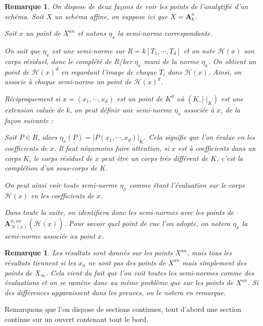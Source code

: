 \documentclass[11pt]{article}
\newcommand{\h}{\mathcal{H}}
\newcommand{\ana}{\mathbf{A}}
\newtheorem{rem}[thm]{Remarque}
\begin{document}
\begin{rem}
On dispose de deux façons de voir les points de l'analytifié d'un schéma. Soit $X$ un schéma affine, on suppose ici que $X = \ana^n_k$.

Soit $x$ un point de $X^{an}$ et notons $\eta_x$ la semi-norme correspondante.

On sait que $\eta_x$ est une semi-norme sur $R = k[T_1, \cdots, T_d]$ et on note $\mathcal{H}(x)$ son corps résiduel, donc le complété de $R/ker~\eta_x$ muni de la norme $\eta_x$. On obtient un point de $\mathcal{H}(x)^d$ en regardant l'image de chaque $T_i$ dans $\mathcal{H}(x)$. Ainsi, on associe à chaque semi-norme un point de $\mathcal{H}(x)^d$.

Réciproquement si $x = (x_1, \cdots, x_d)$ est un point de $K^d$ où $(K, |\cdot|_K)$ est une extension valuée de $k$, on peut définir une semi-norme $\eta_x$ associée à $x$, de la façon suivante : 

Soit $P \in R$, alors $\eta_x(P) = |P(x_1, \cdots, x_d)|_K$. Cela signifie que l'on évalue en les coefficients de $x$. Il faut néanmoins faire attention, si $x$ est à coefficients dans un corps $K$, le corps résiduel de $x$ peut être un corps très différent de $K$, c'est la complétion d'un sous-corps de $K$.

On peut ainsi voir toute semi-norme $\eta_x$ comme étant l'évaluation sur le corps $\mathcal{H}(x)$ en les coefficients de $x$.

Dans toute la suite, on identifiera donc les semi-normes avec les points de $\ana^{n,an}_{\h(x)}(\overline{\h(x)})$. Pour savoir quel point de vue l'on adopte, on notera $\eta_x$ la semi-norme associée au point $x$.
\end{rem}

\begin{rem}
Les résultats sont donnés sur les points $X^{an}$, mais tous les résultats tiennent si les $x_n$ ne sont pas des points de $X^{an}$ mais simplement des points de $X_\infty$. Cela vient du fait que l'on voit toutes les semi-normes comme des évaluations et on se ramène donc au même problème que sur les points de $X^{an}$. Si des différences apparaissent dans les preuves, on le notera en remarque.
\end{rem}

Remarquons que l'on dispose de sections continues, tout d'abord une section continue sur un ouvert contenant tout le bord.
\end{document}
